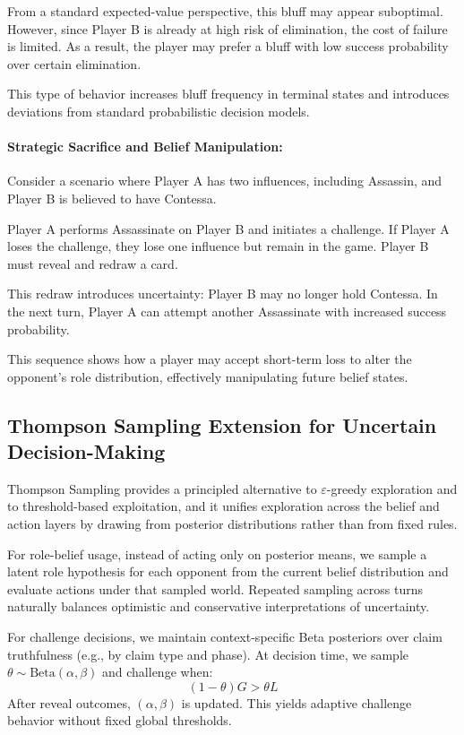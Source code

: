 \documentclass[11pt]{article}
\begin{document}
From a standard expected-value perspective, this bluff may appear suboptimal. However, since Player B is already at high risk of elimination, the cost of failure is limited. As a result, the player may prefer a bluff with low success probability over certain elimination.

This type of behavior increases bluff frequency in terminal states and introduces deviations from standard probabilistic decision models.

\paragraph{Strategic Sacrifice and Belief Manipulation:}
Consider a scenario where Player A has two influences, including Assassin, and Player B is believed to have Contessa.

Player A performs Assassinate on Player B and initiates a challenge. If Player A loses the challenge, they lose one influence but remain in the game. Player B must reveal and redraw a card.

This redraw introduces uncertainty: Player B may no longer hold Contessa. In the next turn, Player A can attempt another Assassinate with increased success probability.

This sequence shows how a player may accept short-term loss to alter the opponent’s role distribution, effectively manipulating future belief states.

\subsection{Thompson Sampling Extension for Uncertain Decision-Making}
Thompson Sampling provides a principled alternative to $\varepsilon$-greedy exploration and to threshold-based exploitation, and it unifies exploration across the belief and action layers by drawing from posterior distributions rather than from fixed rules.

For role-belief usage, instead of acting only on posterior means, we sample a latent role hypothesis for each opponent from the current belief distribution and evaluate actions under that sampled world. Repeated sampling across turns naturally balances optimistic and conservative interpretations of uncertainty.

For challenge decisions, we maintain context-specific Beta posteriors over claim truthfulness (e.g., by claim type and phase). At decision time, we sample $\theta \sim \mathrm{Beta}(\alpha,\beta)$ and challenge when:
\[
(1-\theta)G > \theta L
\]
After reveal outcomes, $(\alpha,\beta)$ is updated. This yields adaptive challenge behavior without fixed global thresholds.
\end{document}
